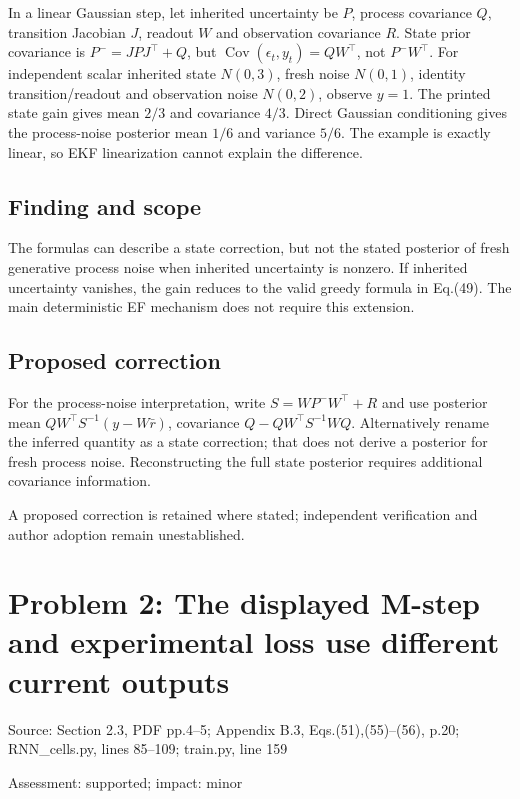 \documentclass[11pt]{article}
\begin{document}
In a linear Gaussian step, let inherited uncertainty be \(P\), process covariance \(Q\), transition Jacobian \(J\), readout \(W\) and observation covariance \(R\). State prior covariance is \(P^-=JPJ^\top+Q\), but \(\operatorname{Cov}(\epsilon_t,y_t)=QW^\top\), not \(P^-W^\top\). For independent scalar inherited state \(N(0,3)\), fresh noise \(N(0,1)\), identity transition/readout and observation noise \(N(0,2)\), observe \(y=1\). The printed state gain gives mean \(2/3\) and covariance \(4/3\). Direct Gaussian conditioning gives the process-noise posterior mean \(1/6\) and variance \(5/6\). The example is exactly linear, so EKF linearization cannot explain the difference.

\subsection*{Finding and scope}

The formulas can describe a state correction, but not the stated posterior of fresh generative process noise when inherited uncertainty is nonzero. If inherited uncertainty vanishes, the gain reduces to the valid greedy formula in Eq.(49). The main deterministic EF mechanism does not require this extension.

\subsection*{Proposed correction}

For the process-noise interpretation, write \(S=WP^-W^\top+R\) and use posterior mean \(QW^\top S^{-1}(y-W\bar r)\), covariance \(Q-QW^\top S^{-1}WQ\). Alternatively rename the inferred quantity as a state correction; that does not derive a posterior for fresh process noise. Reconstructing the full state posterior requires additional covariance information.

A proposed correction is retained where stated; independent verification and author adoption remain unestablished.

\section*{Problem 2: The displayed M-step and experimental loss use different current outputs}

Source: Section 2.3, PDF pp.4–5; Appendix B.3, Eqs.(51),(55)–(56), p.20; RNN\_cells.py, lines 85–109; train.py, line 159

Assessment: supported; impact: minor
\end{document}
